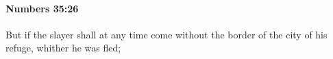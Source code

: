 
		\paragraph{Numbers 35:26} %
			\label{NUMBERS-35-26}

			But if the slayer shall at any time come without the border of the city of his refuge, whither he was fled;


